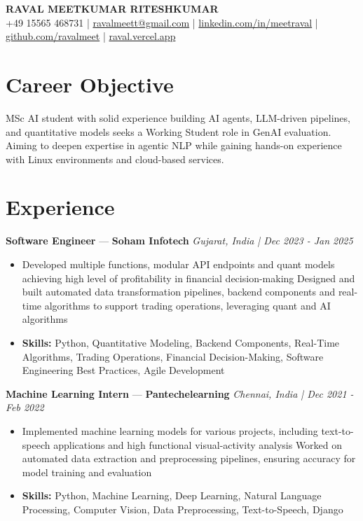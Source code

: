 \documentclass[a4paper,10pt]{article}
\begin{document}
\begin{center}
  {\Large\bfseries RAVAL MEETKUMAR RITESHKUMAR}\\[2pt]
  {\small +49 15565 468731 \;|\; \href{mailto:ravalmeett@gmail.com}{ravalmeett@gmail.com} \;|\; \href{https://www.linkedin.com/in/meetraval/}{linkedin.com/in/meetraval} \;|\; \href{https://github.com/ravalmeet}{github.com/ravalmeet} \;|\; \href{https://raval.vercel.app/}{raval.vercel.app}}
\end{center}
\vspace{-3pt}

\section*{Career Objective}
MSc AI student with solid experience building AI agents, LLM-driven pipelines, and quantitative models seeks a Working Student role in GenAI evaluation. Aiming to deepen expertise in agentic NLP while gaining hands-on experience with Linux environments and cloud-based services.\par

\section*{Experience}
\textbf{Software Engineer} — \textbf{Soham Infotech} \hfill \textit{Gujarat, India \;|\; Dec 2023 - Jan 2025}\par
\vspace{1pt}
\begin{itemize}
  \item Developed multiple functions, modular API endpoints and quant models achieving high level of profitability in financial decision-making Designed and built automated data transformation pipelines, backend components and real-time algorithms to support trading operations, leveraging quant and AI algorithms
  \item \textbf{Skills:} Python, Quantitative Modeling, Backend Components, Real-Time Algorithms, Trading Operations, Financial Decision-Making, Software Engineering Best Practices, Agile Development
\end{itemize}
\vspace{3pt}
\textbf{Machine Learning Intern} — \textbf{Pantechelearning} \hfill \textit{Chennai, India \;|\; Dec 2021 - Feb 2022}\par
\vspace{1pt}
\begin{itemize}
  \item Implemented machine learning models for various projects, including text-to-speech applications and high functional visual-activity analysis Worked on automated data extraction and preprocessing pipelines, ensuring accuracy for model training and evaluation
  \item \textbf{Skills:} Python, Machine Learning, Deep Learning, Natural Language Processing, Computer Vision, Data Preprocessing, Text-to-Speech, Django
\end{itemize}
\end{document}
